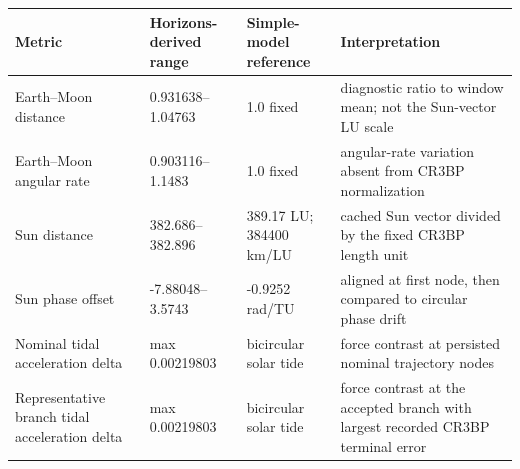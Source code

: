 \begin{tabular}{llll}
\toprule
Metric & Horizons-derived range & Simple-model reference & Interpretation \\
\midrule
Earth--Moon distance & 0.931638--1.04763 & 1.0 fixed & diagnostic ratio to window mean; not the Sun-vector LU scale \\
Earth--Moon angular rate & 0.903116--1.1483 & 1.0 fixed & angular-rate variation absent from CR3BP normalization \\
Sun distance & 382.686--382.896 & 389.17 LU; 384400 km/LU & cached Sun vector divided by the fixed CR3BP length unit \\
Sun phase offset & -7.88048--3.5743 & -0.9252 rad/TU & aligned at first node, then compared to circular phase drift \\
Nominal tidal acceleration delta & max 0.00219803 & bicircular solar tide & force contrast at persisted nominal trajectory nodes \\
Representative branch tidal acceleration delta & max 0.00219803 & bicircular solar tide & force contrast at the accepted branch with largest recorded CR3BP terminal error \\
\bottomrule
\end{tabular}
